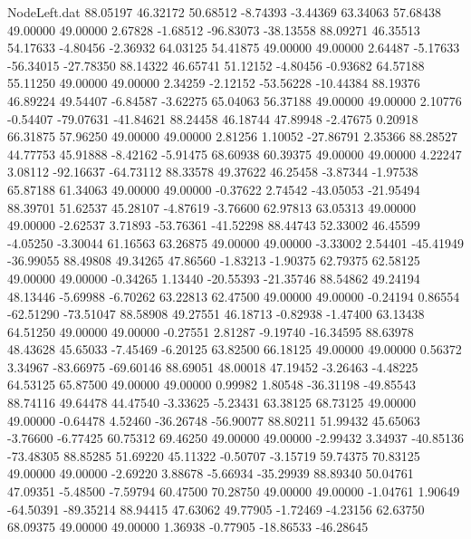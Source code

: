 \begin{filecontents}{NodeLeft.dat}
  88.05197   46.32172   50.68512    -8.74393   -3.44369   63.34063   57.68438   49.00000   49.00000    2.67828   -1.68512  -96.83073  -38.13558
  88.09271   46.35513   54.17633    -4.80456   -2.36932   64.03125   54.41875   49.00000   49.00000    2.64487   -5.17633  -56.34015  -27.78350
  88.14322   46.65741   51.12152    -4.80456   -0.93682   64.57188   55.11250   49.00000   49.00000    2.34259   -2.12152  -53.56228  -10.44384
  88.19376   46.89224   49.54407    -6.84587   -3.62275   65.04063   56.37188   49.00000   49.00000    2.10776   -0.54407  -79.07631  -41.84621
  88.24458   46.18744   47.89948    -2.47675    0.20918   66.31875   57.96250   49.00000   49.00000    2.81256    1.10052  -27.86791    2.35366
  88.28527   44.77753   45.91888    -8.42162   -5.91475   68.60938   60.39375   49.00000   49.00000    4.22247    3.08112  -92.16637  -64.73112
  88.33578   49.37622   46.25458    -3.87344   -1.97538   65.87188   61.34063   49.00000   49.00000   -0.37622    2.74542  -43.05053  -21.95494
  88.39701   51.62537   45.28107    -4.87619   -3.76600   62.97813   63.05313   49.00000   49.00000   -2.62537    3.71893  -53.76361  -41.52298
  88.44743   52.33002   46.45599    -4.05250   -3.30044   61.16563   63.26875   49.00000   49.00000   -3.33002    2.54401  -45.41949  -36.99055
  88.49808   49.34265   47.86560    -1.83213   -1.90375   62.79375   62.58125   49.00000   49.00000   -0.34265    1.13440  -20.55393  -21.35746
  88.54862   49.24194   48.13446    -5.69988   -6.70262   63.22813   62.47500   49.00000   49.00000   -0.24194    0.86554  -62.51290  -73.51047
  88.58908   49.27551   46.18713    -0.82938   -1.47400   63.13438   64.51250   49.00000   49.00000   -0.27551    2.81287   -9.19740  -16.34595
  88.63978   48.43628   45.65033    -7.45469   -6.20125   63.82500   66.18125   49.00000   49.00000    0.56372    3.34967  -83.66975  -69.60146
  88.69051   48.00018   47.19452    -3.26463   -4.48225   64.53125   65.87500   49.00000   49.00000    0.99982    1.80548  -36.31198  -49.85543
  88.74116   49.64478   44.47540    -3.33625   -5.23431   63.38125   68.73125   49.00000   49.00000   -0.64478    4.52460  -36.26748  -56.90077
  88.80211   51.99432   45.65063    -3.76600   -6.77425   60.75312   69.46250   49.00000   49.00000   -2.99432    3.34937  -40.85136  -73.48305
  88.85285   51.69220   45.11322    -0.50707   -3.15719   59.74375   70.83125   49.00000   49.00000   -2.69220    3.88678   -5.66934  -35.29939
  88.89340   50.04761   47.09351    -5.48500   -7.59794   60.47500   70.28750   49.00000   49.00000   -1.04761    1.90649  -64.50391  -89.35214
  88.94415   47.63062   49.77905    -1.72469   -4.23156   62.63750   68.09375   49.00000   49.00000    1.36938   -0.77905  -18.86533  -46.28645

\end{filecontents}
